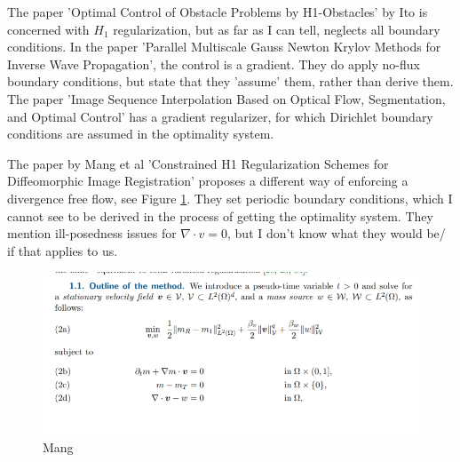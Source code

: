 \documentclass[11pt, a4paper]{article}
\theoremstyle{definition}
\begin{document}
The paper 'Optimal Control of Obstacle Problems by H1-Obstacles' by Ito is concerned with $H_1$ regularization, but as far as I can tell, neglects all boundary conditions.
In the paper 'Parallel Multiscale Gauss Newton Krylov Methods for Inverse Wave Propagation', the control is a gradient. They do apply no-flux boundary conditions, but state that they 'assume' them, rather than derive them.
The paper 'Image Sequence Interpolation Based on Optical Flow, Segmentation, and Optimal Control' has a gradient regularizer, for which Dirichlet boundary conditions are assumed in the optimality system.



The paper by Mang et al 'Constrained H1 Regularization Schemes for Diffeomorphic Image Registration' proposes a different way of enforcing a divergence free flow, see Figure \ref{F2}. They set periodic boundary conditions, which I cannot see to be derived in the process of getting the optimality system. They mention ill-posedness issues for $\nabla \cdot v = 0$, but I don't know what they would be/ if that applies to us.
	\begin{figure}[h]
	\centering
	\includegraphics[scale=0.7]{Mang.png}
	\caption{Mang} 
	\label{F2}
\end{figure}
\end{document}
